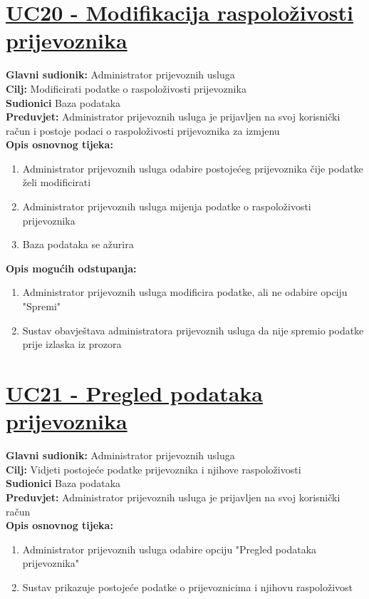 \documentclass{article}
\begin{document}
	\section* {\underline{UC20 - Modifikacija raspoloživosti prijevoznika}}
	\textbf{Glavni sudionik:} Administrator prijevoznih usluga \\
	\textbf{Cilj:} Modificirati podatke o raspoloživosti prijevoznika\\
	\textbf{Sudionici} Baza podataka \\
	\textbf{Preduvjet:} Administrator prijevoznih usluga je prijavljen na svoj korisnički račun i postoje podaci o raspoloživosti prijevoznika za izmjenu \\
	\textbf{Opis osnovnog tijeka:}
	\begin{enumerate}
		\item Administrator prijevoznih usluga odabire postojećeg prijevoznika čije podatke želi modificirati
		\item Administrator prijevoznih usluga mijenja podatke o raspoloživosti prijevoznika
		\item Baza podataka se ažurira
	\end{enumerate}
	\textbf{Opis mogućih odstupanja:}
	\begin{enumerate}
		\item Administrator prijevoznih usluga modificira podatke, ali ne odabire opciju "Spremi"
		\item Sustav obavještava administratora prijevoznih usluga da nije spremio podatke prije izlaska iz prozora
	\end{enumerate}
	
	\section* {\underline{UC21 - Pregled podataka prijevoznika}}
	\textbf{Glavni sudionik:} Administrator prijevoznih usluga \\
	\textbf{Cilj:} Vidjeti postojeće podatke prijevoznika i njihove raspoloživosti\\
	\textbf{Sudionici} Baza podataka \\
	\textbf{Preduvjet:} Administrator prijevoznih usluga je prijavljen na svoj korisnički račun \\
	\textbf{Opis osnovnog tijeka:}
	\begin{enumerate}
		\item Administrator prijevoznih usluga odabire opciju "Pregled podataka prijevoznika"
		\item Sustav prikazuje postojeće podatke o prijevoznicima i njihovu raspoloživost
	\end{enumerate}
	
\end{document}
